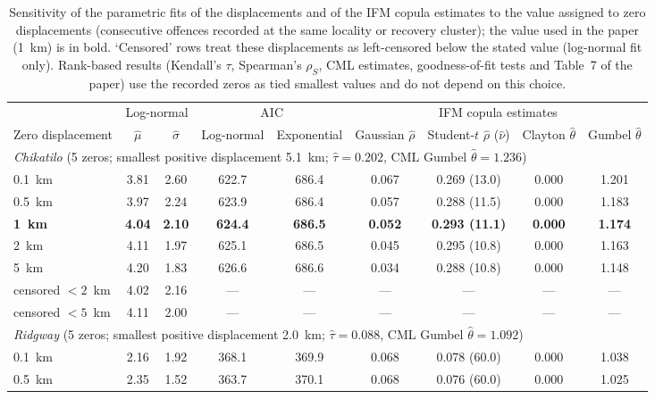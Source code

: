 \begin{table}[htbp]
\centering\footnotesize\setlength{\tabcolsep}{4pt}
\caption{Sensitivity of the parametric fits of the displacements and of the IFM copula estimates to the value assigned to zero displacements (consecutive offences recorded at the same locality or recovery cluster); the value used in the paper (1~km) is in bold. `Censored' rows treat these displacements as left-censored below the stated value (log-normal fit only). Rank-based results (Kendall's $\tau$, Spearman's $\rho_S$, CML estimates, goodness-of-fit tests and Table~7 of the paper) use the recorded zeros as tied smallest values and do not depend on this choice.}
\begin{tabular}{lcccccccc}
\toprule
 & \multicolumn{2}{c}{Log-normal} & \multicolumn{2}{c}{AIC} & \multicolumn{4}{c}{IFM copula estimates}\\
\cmidrule(lr){2-3}\cmidrule(lr){4-5}\cmidrule(lr){6-9}
Zero displacement & $\hat\mu$ & $\hat\sigma$ & Log-normal & Exponential & Gaussian $\hat\rho$ & Student-$t$ $\hat\rho$ ($\hat\nu$) & Clayton $\hat\theta$ & Gumbel $\hat\theta$\\
\midrule
\multicolumn{9}{l}{\textit{Chikatilo} (5 zeros; smallest positive displacement 5.1~km; $\hat\tau=0.202$, CML Gumbel $\hat\theta=1.236$)}\\
0.1~km & 3.81 & 2.60 & 622.7 & 686.4 & 0.067 & 0.269 (13.0) & 0.000 & 1.201\\
0.5~km & 3.97 & 2.24 & 623.9 & 686.4 & 0.057 & 0.288 (11.5) & 0.000 & 1.183\\
\textbf{1~km} & \textbf{4.04} & \textbf{2.10} & \textbf{624.4} & \textbf{686.5} & \textbf{0.052} & \textbf{0.293 (11.1)} & \textbf{0.000} & \textbf{1.174}\\
2~km & 4.11 & 1.97 & 625.1 & 686.5 & 0.045 & 0.295 (10.8) & 0.000 & 1.163\\
5~km & 4.20 & 1.83 & 626.6 & 686.6 & 0.034 & 0.288 (10.8) & 0.000 & 1.148\\
censored $<2$~km & 4.02 & 2.16 & --- & --- & --- & --- & --- & ---\\
censored $<5$~km & 4.11 & 2.00 & --- & --- & --- & --- & --- & ---\\
\midrule
\multicolumn{9}{l}{\textit{Ridgway} (5 zeros; smallest positive displacement 2.0~km; $\hat\tau=0.088$, CML Gumbel $\hat\theta=1.092$)}\\
0.1~km & 2.16 & 1.92 & 368.1 & 369.9 & 0.068 & 0.078 (60.0) & 0.000 & 1.038\\
0.5~km & 2.35 & 1.52 & 363.7 & 370.1 & 0.068 & 0.076 (60.0) & 0.000 & 1.025\\

\end{tabular}
\end{table}
